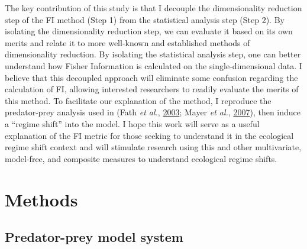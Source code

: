 \documentclass[12pt,twoside,openany]{reedthesis}
\begin{document}
The key contribution of this study is that I decouple the dimensionality reduction step of the FI method (Step 1) from the statistical analysis step (Step 2). By isolating the dimensionality reduction step, we can evaluate it based on its own merits and relate it to more well-known and established methods of dimensionality reduction. By isolating the statistical analysis step, one can better understand how Fisher Information is calculated on the single-dimensional data. I believe that this decoupled approach will eliminate some confusion regarding the calculation of FI, allowing interested researchers to readily evaluate the merits of this method. To facilitate our explanation of the method, I reproduce the predator-prey analysis used in (Fath \emph{et al.}, \protect\hyperlink{ref-fath_regime_2003}{2003}; Mayer \emph{et al.}, \protect\hyperlink{ref-mayer_applications_2007}{2007}), then induce a ``regime shift'' into the model. I hope this work will serve as a useful explanation of the FI metric for those seeking to understand it in the ecological regime shift context and will stimulate research using this and other multivariate, model-free, and composite measures to understand ecological regime shifts.

\hypertarget{methods-1}{%
\section{Methods}\label{methods-1}}

\hypertarget{predator-prey-model-system}{%
\subsection{Predator-prey model system}\label{predator-prey-model-system}}
\end{document}
